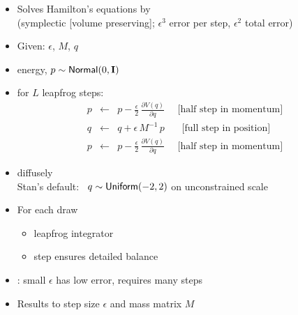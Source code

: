 \documentclass[10pt]{report}
\newcommand{\sld}[1]{\newpage{\noindent\LARGE \ \ \
    \textcolor{MidnightBlue}{\bfseries #1}}\vspace*{4pt}}
\newcommand{\myemph}[1]{{\color{MidnightBlue}{\bfseries #1}}}
\begin{document}
\sld{Leapfrog Integrator Steps}
\begin{itemize}
\item Solves Hamilton's equations by \myemph{simulating dynamics}
\\
{\footnotesize (symplectic [volume preserving]; $\epsilon^3$ error per step, $\epsilon^2$ total error)}
\item Given: \myemph{step size} $\epsilon$, \myemph{mass matrix} $M$, \myemph{parameters} $q$
\item \myemph{Initialize kinetic} energy, $p \sim {\sf
    Normal}(0,\mbox{\bf I})$
\item \myemph{Repeat} for $L$ leapfrog steps:
\begin{eqnarray*}
p & \leftarrow &
p - \frac{\epsilon}{2} \, \frac{\partial V(q)}{\partial q}
\ \ \ \ \ \ \mbox{[half step in momentum]}
\\[6pt]
q & \leftarrow &
q + \epsilon \, M^{-1} \, p
\ \ \ \ \ \ \ \  \mbox{[full step in position]}
\\[6pt]
p & \leftarrow &
p - \frac{\epsilon}{2} \, \frac{\partial V(q)}{\partial q}
\ \ \ \ \ \ \mbox{[half step in momentum]}
\end{eqnarray*}
\end{itemize}

\sld{Standard HMC}
\begin{itemize}
\item \myemph{Initialize parameters} diffusely
\\ {\footnotesize Stan's default: \ $q \sim \mbox{\sf
    Uniform}(-2,2)$ on unconstrained scale}
\item For each draw
\vspace*{-3pt}
\begin{itemize}\small
\item leapfrog integrator \myemph{generates proposal}
\item \myemph{Metropolis accept} step ensures detailed balance
\end{itemize}
\vfill
\item \myemph{Balancing act}: small $\epsilon$ has low error, requires many steps
\item Results \myemph{highly sensitive} to step size $\epsilon$ and mass matrix
  $M$
\end{itemize}

\sld{Tuning HMC During Warmup}
\end{document}
